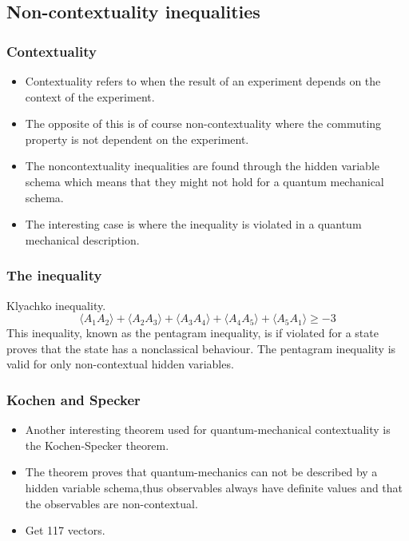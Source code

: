\documentclass[•]{beamer}
\theoremstyle{remark}
\begin{document}
\subsection{Non-contextuality inequalities}
\begin{frame}[shrink=10]\frametitle{Contextuality}
\begin{block}

\begin{itemize}
\item Contextuality refers to when the result of an experiment depends on the context
of the experiment. \pause
\item The opposite of this is of course non-contextuality where the commuting property is not dependent on the experiment. \pause
\item The noncontextuality inequalities are found through the hidden variable
schema which means that they might not hold for a quantum mechanical schema. \pause
\item The interesting case is where the inequality is violated in a quantum mechanical
description.
\end{itemize}
\end{block}
\end{frame}
\begin{frame}[shrink=10]\frametitle{The inequality}
\begin{block}

Klyachko inequality.
\begin{equation*} \label{eq:Inequality}
\langle A_1 A_2 \rangle + \langle A_2 A_3 \rangle + \langle A_3 A_4 \rangle + \langle A_4 A_5 \rangle +
\langle A_5 A_1 \rangle \geq -3
\end{equation*}
This inequality, known as the pentagram inequality, is if violated for a state proves that the state has a nonclassical behaviour. The pentagram inequality is valid for only non-contextual hidden variables.
\end{block}
\end{frame}

\begin{frame}\frametitle{Kochen
and Specker}
\begin{block}

\begin{itemize}
\item Another interesting theorem used for quantum-mechanical contextuality is the
Kochen-Specker theorem. \pause

\item The theorem proves that quantum-mechanics can not be described by a hidden variable schema,thus observables always have definite values and that the observables are non-contextual. \pause

\item Get 117 vectors.
\end{itemize}
\end{block}
\end{frame}
\end{document}
